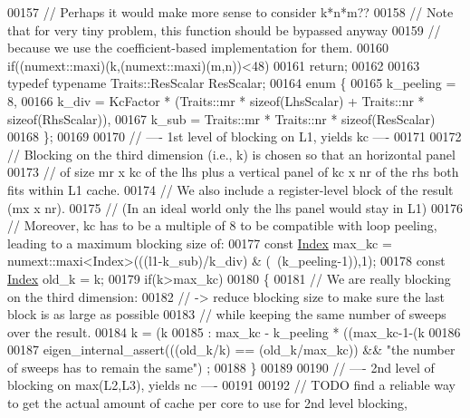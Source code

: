 \begin{DoxyCode}
00157     \textcolor{comment}{// Perhaps it would make more sense to consider k*n*m??}
00158     \textcolor{comment}{// Note that for very tiny problem, this function should be bypassed anyway}
00159     \textcolor{comment}{// because we use the coefficient-based implementation for them.}
00160     \textcolor{keywordflow}{if}((numext::maxi)(k,(numext::maxi)(m,n))<48)
00161       \textcolor{keywordflow}{return};
00162 
00163     \textcolor{keyword}{typedef} \textcolor{keyword}{typename} Traits::ResScalar ResScalar;
00164     \textcolor{keyword}{enum} \{
00165       k\_peeling = 8,
00166       k\_div = KcFactor * (Traits::mr * \textcolor{keyword}{sizeof}(LhsScalar) + Traits::nr * \textcolor{keyword}{sizeof}(RhsScalar)),
00167       k\_sub = Traits::mr * Traits::nr * \textcolor{keyword}{sizeof}(ResScalar)
00168     \};
00169 
00170     \textcolor{comment}{// ---- 1st level of blocking on L1, yields kc ----}
00171 
00172     \textcolor{comment}{// Blocking on the third dimension (i.e., k) is chosen so that an horizontal panel}
00173     \textcolor{comment}{// of size mr x kc of the lhs plus a vertical panel of kc x nr of the rhs both fits within L1 cache.}
00174     \textcolor{comment}{// We also include a register-level block of the result (mx x nr).}
00175     \textcolor{comment}{// (In an ideal world only the lhs panel would stay in L1)}
00176     \textcolor{comment}{// Moreover, kc has to be a multiple of 8 to be compatible with loop peeling, leading to a maximum
       blocking size of:}
00177     \textcolor{keyword}{const} \hyperlink{namespace_eigen_a62e77e0933482dafde8fe197d9a2cfde}{Index} max\_kc = numext::maxi<Index>(((l1-k\_sub)/k\_div) & (~(k\_peeling-1)),1);
00178     \textcolor{keyword}{const} \hyperlink{namespace_eigen_a62e77e0933482dafde8fe197d9a2cfde}{Index} old\_k = k;
00179     \textcolor{keywordflow}{if}(k>max\_kc)
00180     \{
00181       \textcolor{comment}{// We are really blocking on the third dimension:}
00182       \textcolor{comment}{// -> reduce blocking size to make sure the last block is as large as possible}
00183       \textcolor{comment}{//    while keeping the same number of sweeps over the result.}
00184       k = (k%
00185                         : max\_kc - k\_peeling * ((max\_kc-1-(k%
00186 
00187       eigen\_internal\_assert(((old\_k/k) == (old\_k/max\_kc)) && \textcolor{stringliteral}{"the number of sweeps has to remain the same"})
      ;
00188     \}
00189 
00190     \textcolor{comment}{// ---- 2nd level of blocking on max(L2,L3), yields nc ----}
00191 
00192     \textcolor{comment}{// TODO find a reliable way to get the actual amount of cache per core to use for 2nd level blocking,
}
\end{DoxyCode}
